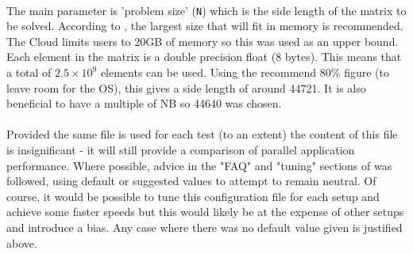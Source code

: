 \documentclass{article}
\begin{document}
            \paragraph{}
            The main parameter is 'problem size' (\verb|N|)  which is the side length of the matrix to be solved. According to \cite{hpl2016}, the largest size that will fit in memory is recommended. The Cloud limits users to 20GB of memory so this was used as an upper bound. Each element in the matrix is a double precision float (8 bytes). This means that a total of $2.5 \times 10 ^ 9$ elements can be used. Using the recommend 80\% figure (to leave room for the OS), this gives a side length of around 44721. It is also beneficial to have a multiple of NB so 44640 was chosen.

            \paragraph{}
            Provided the same file is used for each test (to an extent) the content of this file is insignificant - it will still provide a comparison of parallel application performance. Where possible, advice in the "FAQ" and "tuning" sections of \cite{hpl2016} was followed, using default or suggested values to attempt to remain neutral. Of course, it would be possible to tune this configuration file for each setup and achieve some faster speeds but this would likely be at the expense of other setups and introduce a bias. Any case where there was no default value given is justified above.
\end{document}
